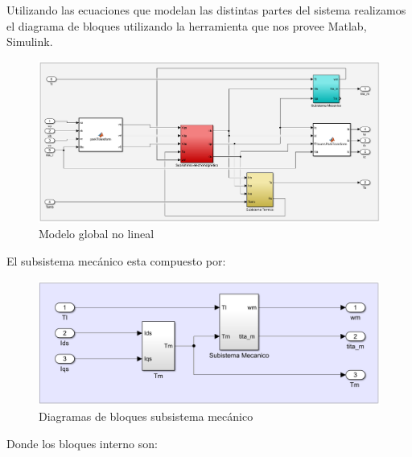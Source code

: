 \documentclass{article}
\begin{document}

Utilizando las ecuaciones que modelan las distintas partes del sistema realizamos el 
diagrama de bloques utilizando la herramienta que nos provee Matlab, Simulink.

\begin{figure}[H]
    \centering
    \includegraphics[width=1\textwidth]{no_lineal.png}
    \caption{Modelo global no lineal}
\end{figure}

El subsistema mecánico esta compuesto por:

\begin{figure}[H]
    \centering
    \includegraphics[width=1\textwidth]{sub_mecanico.png}
    \caption{Diagramas de bloques subsistema mecánico}
\end{figure}

Donde los bloques interno son:
\end{document}
